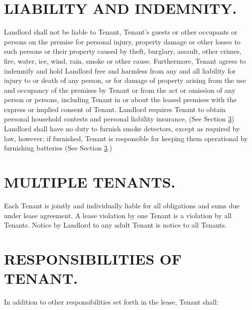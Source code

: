 \documentclass[9pt]{article}
\begin{document}
	\section{LIABILITY AND INDEMNITY.}
	Landlord shall not be liable to Tenant, Tenant's guests or other occupants or persons on the premise for personal injury, property damage or other losses to such persons or their property caused by theft, burglary, assault, other crimes, fire, water, ice, wind, rain, smoke or other cause. Furthermore, Tenant agrees to indemnify and hold Landlord free and harmless from any and all liability for injury to or death of any person, or for damage of property arising from the use and occupancy of the premises by Tenant or from the act or omission of any person or persons, including Tenant in or about the leased premises with the express or implied consent of Tenant. Landlord requires Tenant to obtain personal household contests and personal liability insurance, (See Section \ref{tenant_responsibilities}) Landlord shall have no duty to furnish smoke detectors, except as required by law, however, if furnished, Tenant is responsible for keeping them operational by furnishing batteries (See Section \ref{tenant_responsibilities}.)
	
	\section{MULTIPLE TENANTS.}
	Each Tenant is jointly and individually liable for all obligations and sums due under lease agreement. A lease violation by one Tenant is a violation by all Tenants. Notice by Landlord to any adult Tenant is notice to all Tenants.
	
	\section{RESPONSIBILITIES OF TENANT.}
	\label{tenant_responsibilities}
	In addition to other responsibilities set forth in the lease, Tenant shall:
\end{document}
